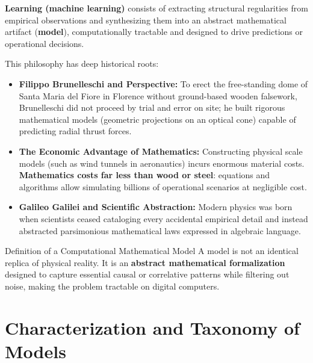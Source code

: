 \begin{definition}
\textbf{Learning (machine learning)} consists of extracting structural regularities from empirical observations and synthesizing them into an abstract mathematical artifact (\textbf{model}), computationally tractable and designed to drive predictions or operational decisions.
\end{definition}

This philosophy has deep historical roots:
\begin{itemize}
    \item \textbf{Filippo Brunelleschi and Perspective:} To erect the free-standing dome of Santa Maria del Fiore in Florence without ground-based wooden falsework, Brunelleschi did not proceed by trial and error on site; he built rigorous mathematical models (geometric projections on an optical cone) capable of predicting radial thrust forces.
    \item \textbf{The Economic Advantage of Mathematics:} Constructing physical scale models (such as wind tunnels in aeronautics) incurs enormous material costs. \textbf{Mathematics costs far less than wood or steel}: equations and algorithms allow simulating billions of operational scenarios at negligible cost.
    \item \textbf{Galileo Galilei and Scientific Abstraction:} Modern physics was born when scientists ceased cataloging every accidental empirical detail and instead abstracted parsimonious mathematical laws expressed in algebraic language.
\end{itemize}

\begin{noteblock}{Definition of a Computational Mathematical Model}
A model is not an identical replica of physical reality. It is an \textbf{abstract mathematical formalization} designed to capture essential causal or correlative patterns while filtering out noise, making the problem tractable on digital computers.
\end{noteblock}

\FloatBarrier
\section{Characterization and Taxonomy of Models}

